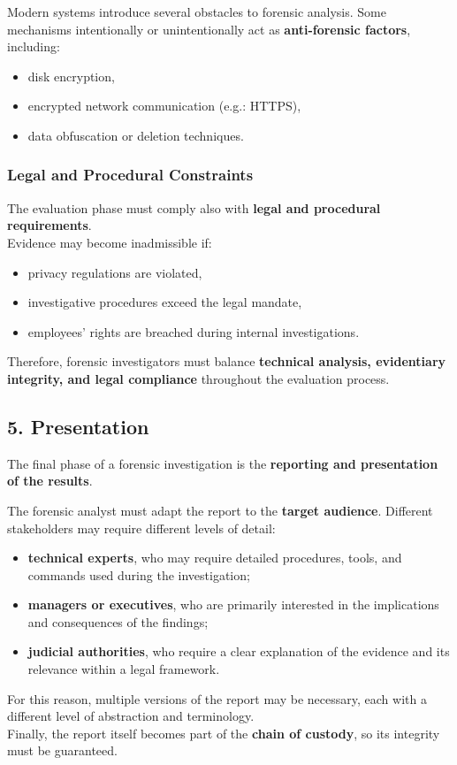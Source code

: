 Modern systems introduce several obstacles to forensic analysis.  
Some mechanisms intentionally or unintentionally act as \textbf{anti-forensic factors}, including:

\begin{itemize}
\item disk encryption,
\item encrypted network communication (e.g.: HTTPS),
\item data obfuscation or deletion techniques.
\end{itemize}

\subsubsection*{Legal and Procedural Constraints}

The evaluation phase must comply also with \textbf{legal and procedural requirements}.
\\
Evidence may become inadmissible if:

\begin{itemize}
\item privacy regulations are violated,
\item investigative procedures exceed the legal mandate,
\item employees’ rights are breached during internal investigations.
\end{itemize}
\noindent
Therefore, forensic investigators must balance \textbf{technical analysis, evidentiary integrity, and legal compliance} throughout the evaluation process.


\subsection{5. Presentation}

The final phase of a forensic investigation is the \textbf{reporting and presentation of the results}.
\medskip

\noindent
The forensic analyst must adapt the report to the \textbf{target audience}. Different stakeholders may require different levels of detail:

\begin{itemize}
\item \textbf{technical experts}, who may require detailed procedures, tools, and commands used during the investigation;
\item \textbf{managers or executives}, who are primarily interested in the implications and consequences of the findings;
\item \textbf{judicial authorities}, who require a clear explanation of the evidence and its relevance within a legal framework.
\end{itemize}

\noindent
For this reason, multiple versions of the report may be necessary, each with a different level of abstraction and terminology.\\

\medskip
\noindent
Finally, the report itself becomes part of the \textbf{chain of custody}, so its integrity must be guaranteed.
